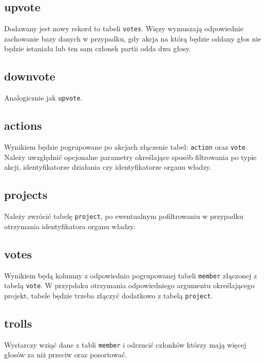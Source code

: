 \documentclass[polish,11pt,a4paper]{article}
\begin{document}
    \subsection{upvote}
        Dodawany jest nowy rekord to tabeli \texttt{votes}. Więzy wymuszają odpowiednie zachowanie bazy danych w przypadku, gdy akcja na którą będzie oddany głos nie będzie istaniała lub ten sam członek partii odda dwa głosy.
    \subsection{downvote}
        Analogicznie jak \texttt{upvote}.

    \subsection{actions}
        Wynikiem będzie pogrupowane po akcjach złączenie tabel: \texttt{action} oraz \texttt{vote}. Należy uwzględnić opcjonalne parametry określające sposób filtrowania po typie akcji, identyfikatorze działania czy identyfikatorze organu władzy.
        
    \subsection{projects}
       Należy zwrócić tabelę \texttt{project}, po ewentualnym pofiltrowaniu w przypadku otrzymania identyfikatora organu władzy. 
        
    \subsection{votes}
        Wynikiem będą kolumny z odpowiednio pogrupowanej tabeli \texttt{member} złączonej z tabelą \texttt{vote}. W przypdaku otrzymania odpowiedniego argumentu określającego projekt, tabele będzie trzeba złączyć dodatkowo z tabelą \texttt{project}.

    \subsection{trolls}
        Wystarczy wziąć dane z tabli \texttt{member} i odrzucić członków którzy mają więcej głosów za niż przeciw oraz posortować.
    
\end{document}
